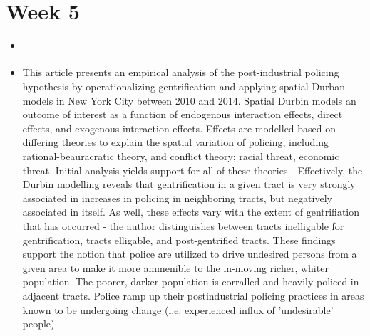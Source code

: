 \documentclass{article} \usepackage{filecontents}
\begin{document}
\section{Week 5}
\begin{itemize}
  
\item \cite{laniyonu2018CoffeeShops}
\item This article presents an empirical analysis of the
  post-industrial policing hypothesis by operationalizing
  gentrification and applying spatial Durban models in New York City
  between 2010 and 2014. Spatial Durbin models an outcome of interest
  as a function of endogenous interaction effects, direct effects, and
  exogenous interaction effects. Effects are modelled based on
  differing theories to explain the spatial variation of policing,
  including rational-beauracratic theory, and conflict theory; racial
  threat, economic threat. Initial analysis yields support for all of
  these theories - Effectively, the Durbin modelling reveals that
  gentrification in a given tract is very strongly associated in
  increases in policing in neighboring tracts, but negatively
  associated in itself. As well, these effects vary with the extent of
  gentrifiation that has occurred - the author distinguishes between
  tracts inelligable for gentrification, tracts elligable, and
  post-gentrified tracts. These findings support the notion that
  police are utilized to drive undesired persons from a given area to
  make it more ammenible to the in-moving richer, whiter
  population. The poorer, darker population is corralled and heavily
  policed in adjacent tracts. Police ramp up their postindustrial
  policing practices in areas known to be undergoing change
  (i.e. experienced influx of 'undesirable' people).


\end{itemize}
\end{document}
